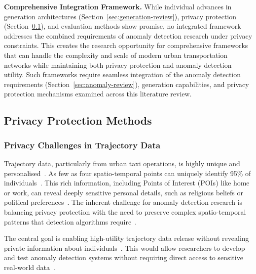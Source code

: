 \documentclass[runningheads]{llncs}
\begin{document}
\textbf{Comprehensive Integration Framework.} While individual advances in generation architectures (Section~\ref{sec:generation-review}), privacy protection (Section~\ref{sec:privacy-review}), and evaluation methods show promise, no integrated framework addresses the combined requirements of anomaly detection research under privacy constraints. This creates the research opportunity for comprehensive frameworks that can handle the complexity and scale of modern urban transportation networks while maintaining both privacy protection and anomaly detection utility. Such frameworks require seamless integration of the anomaly detection requirements (Section~\ref{sec:anomaly-review}), generation capabilities, and privacy protection mechanisms examined across this literature review.

\subsection{Privacy Protection Methods}
\label{sec:privacy-review}

\subsubsection{Privacy Challenges in Trajectory Data}

Trajectory data, particularly from urban taxi operations, is highly unique and personalised~\cite{Primault2019LongRoad,Buchholz2022RAoPT,Ma2021TrajectoryPrivacy}. As few as four spatio-temporal points can uniquely identify 95\% of individuals~\cite{Primault2019LongRoad,Buchholz2022RAoPT,Ma2021TrajectoryPrivacy}. This rich information, including Points of Interest (POIs) like home or work, can reveal deeply sensitive personal details, such as religious beliefs or political preferences~\cite{Primault2019LongRoad,Buchholz2022RAoPT}. The inherent challenge for anomaly detection research is balancing privacy protection with the need to preserve complex spatio-temporal patterns that detection algorithms require~\cite{Buchholz2024SoK,Buchholz2022RAoPT,Primault2019LongRoad,Naghizade2020PrivacyContextAware}.

The central goal is enabling high-utility trajectory data release without revealing private information about individuals~\cite{Buchholz2024SoK,Rao2021LSTMTrajGAN,Liu2018TrajGANs,Jin2023SurveyExpStudy,Ma2021TrajectoryPrivacy,Naghizade2020PrivacyContextAware}. This would allow researchers to develop and test anomaly detection systems without requiring direct access to sensitive real-world data~\cite{Buchholz2024SoK,Rao2021LSTMTrajGAN,Liu2018TrajGANs}.
\end{document}
